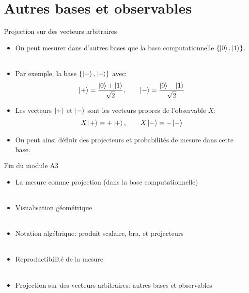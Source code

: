 \documentclass[aspectratio=169,12pt]{beamer}
\begin{document}
\section{Autres bases et observables}

\begin{frame}{Projection sur des vecteurs arbitraires}
  \begin{itemize}[<+->]
    \setlength{\itemsep}{0.8em}
    \item On peut mesurer dans d'autres bases que la base computationnelle $\{\ket{0}, \ket{1}\}$.\\~\\
    \item Par exemple, la base $\{\ket{+}, \ket{-}\}$ avec:
    $$\ket{+} = \frac{\ket{0}+\ket{1}}{\sqrt{2}}, \qquad \ket{-} = \frac{\ket{0}-\ket{1}}{\sqrt{2}}$$
    \item Les vecteurs $\ket{+}$ et $\ket{-}$ sont les vecteurs propres de l'observable $X$:
    $$X\ket{+} = +\ket{+}, \qquad X\ket{-} = -\ket{-}$$
    \item On peut ainsi définir des projecteurs et probabilités de mesure dans cette base.
  \end{itemize}
\end{frame}

\begin{frame}{Fin du module A3}
    \begin{itemize}
        \item La mesure comme projection (dans la base computationnelle)\\~\\
        \item Visualisation géométrique\\~\\
        \item Notation algébrique: produit scalaire, bra, et projecteurs\\~\\
        \item Reproductibilité de la mesure\\~\\
        \item Projection sur des vecteurs arbitraires: autres bases et observables
    \end{itemize}
\end{frame}
\end{document}
